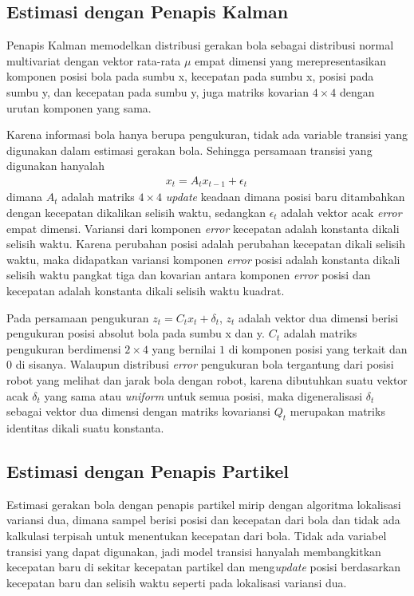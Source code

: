 \subsection{Estimasi dengan Penapis Kalman}

Penapis Kalman memodelkan distribusi gerakan bola sebagai distribusi normal multivariat dengan vektor rata-rata $\mu$ empat dimensi yang merepresentasikan komponen posisi bola pada sumbu x, kecepatan pada sumbu x, posisi pada sumbu y, dan kecepatan pada sumbu y, juga matriks kovarian $4 \times 4$ dengan urutan komponen yang sama.

Karena informasi bola hanya berupa pengukuran, tidak ada variable transisi yang digunakan dalam estimasi gerakan bola. Sehingga persamaan transisi yang digunakan hanyalah
\begin{align}
    x_t = A_t x_{t-1} + \epsilon_t \,
\end{align}
dimana $A_t$ adalah matriks $4 \times 4$ \textit{update} keadaan dimana posisi baru ditambahkan dengan kecepatan dikalikan selisih waktu, sedangkan $\epsilon_t$ adalah vektor acak \textit{error} empat dimensi. Variansi dari komponen \textit{error} kecepatan adalah konstanta dikali selisih waktu. Karena perubahan posisi adalah perubahan kecepatan dikali selisih waktu, maka didapatkan variansi komponen \textit{error} posisi adalah konstanta dikali selisih waktu pangkat tiga dan kovarian antara komponen \textit{error} posisi dan kecepatan adalah konstanta dikali selisih waktu kuadrat.

Pada persamaan pengukuran $z_t = C_t x_t + \delta_t$, $z_t$ adalah vektor dua dimensi berisi pengukuran posisi absolut bola pada sumbu x dan y. $C_t$ adalah matriks pengukuran berdimensi $2 \times 4$ yang bernilai $1$ di komponen posisi yang terkait dan $0$ di sisanya. Walaupun distribusi \textit{error} pengukuran bola tergantung dari posisi robot yang melihat dan jarak bola dengan robot, karena dibutuhkan suatu vektor acak $\delta_t$ yang sama atau \textit{uniform} untuk semua posisi, maka digeneralisasi $\delta_t$ sebagai vektor dua dimensi dengan matriks kovariansi $Q_t$ merupakan matriks identitas dikali suatu konstanta.

\subsection{Estimasi dengan Penapis Partikel}

Estimasi gerakan bola dengan penapis partikel mirip dengan algoritma lokalisasi variansi dua, dimana sampel berisi posisi dan kecepatan dari bola dan tidak ada kalkulasi terpisah untuk menentukan kecepatan dari bola. Tidak ada variabel transisi yang dapat digunakan, jadi model transisi hanyalah membangkitkan kecepatan baru di sekitar kecepatan partikel dan meng\textit{update} posisi berdasarkan kecepatan baru dan selisih waktu seperti pada lokalisasi variansi dua.

